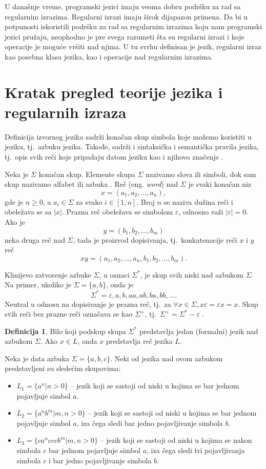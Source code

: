 \documentclass[12pt,oneside]{memoir}
\theoremstyle{plain}
\theoremstyle{definition}
\newtheorem{defn}{Definicija} %
\begin{document}
U današnje vreme, programski jezici imaju veoma dobru podršku za rad sa regularnim izrazima. Regularni izrazi imaju širok dijapazon primena. Da bi u potpunosti iskoristili podršku za rad sa regularnim izrazima koju nam programski jezici pružaju, neophodno je pre svega razumeti šta su regularni izrazi i koje operacije je moguće vršiti nad njima. U tu svrhu definisan je jezik, regularni izraz kao posebna klasa jezika, kao i operacije nad regularnim izrazima. 

\section{Kratak pregled teorije jezika i regularnih izraza} 

Definicija izvornog jezika sadrži konačan skup simbola koje možemo koristiti u jeziku, tj.~azbuku jezika. Takođe, sadrži i sintaksička i semantička pravila jezika, tj.~opis svih reči koje pripadaju datom jeziku kao i njihovo značenje \cite{Vitas}.

Neka je $\Sigma$ konačan skup. Elemente skupa $\Sigma$ nazivamo slova ili simboli, dok sam skup nazivamo alfabet ili azbuka \cite{Vitas}. Reč (eng. \textit{word}) nad $\Sigma$ je svaki konačan niz $$x = (a_1, a_2, …, a_n),$$ gde je $n \geq 0$, a $a_i \in \Sigma$ za svako $\textit{i} \in [1,n]$. Broj $n$ se naziva dužina reči i obeležava se sa $|x|$. Prazna reč  obeležava se simbolom $\varepsilon$, odnosno važi $| \varepsilon |=0$. Ako je $$y = (b_1, b_2, …, b_m)$$ neka druga reč nad $\Sigma$, tada je proizvod dopisivanja, tj.~konkatenacije reči $x$ i $y$ reč $$xy =(a_1, a_2, …, a_n, b_1, b_2, …, b_m).$$


Klinijevo zatvorenje azbuke $\Sigma$, u oznaci $\Sigma^*$, je skup svih niski nad azbukom $\Sigma$. Na primer, ukoliko je $\Sigma = \{a,b\}$, onda je $$\Sigma^* = { \varepsilon, a, b, aa, ab, ba, bb, …}.$$
Neutral u odnosu na dopisivanje je prazna reč, tj.~za $\forall x\in \Sigma, x\varepsilon = \varepsilon x = x$. Skup svih reči bez prazne reči označava se kao $\Sigma^+$, tj.~$\Sigma^+ = \Sigma^* - { \varepsilon }$ \cite{Vitas}. 

\begin{defn}
Bilo koji podskup skupa $\Sigma^*$ predstavlja jedan (formalni) jezik nad azbukom $\Sigma$. Ako $x \in L$, onda $x$ predstavlja reč jezika $L$.
\end{defn}

Neka je data azbuka $\Sigma = \{ a, b, c\}$. Neki od jezika nad ovom azbukom predstavljeni su sledećim skupovima:
\begin{itemize}
\item[] $L_1 = \{a^n | n > 0\}$ – jezik koji se sastoji od niski u kojima se bar jednom pojavljuje simbol $a$.
\item[] $L_2 = \{a^nb^m | m, n > 0\}$ – jezik koji se sastoji od niski u kojima se bar jednom pojavljuje simbol $a$, iza čega sledi bar jedno pojavljivanje simbola $b$.
\item[] $L_3 = \{ca^ncccb^m | m, n > 0\}$ – jezik koji se sastoji od niski u kojima se nakon simbola $c$ bar jednom pojavljuje simbol $a$, iza čega sledi tri pojavljivanja simbola $c$ i bar jedno pojavljivanje simbola $b$.
\end{itemize}
\end{document}
